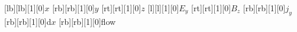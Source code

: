    [lb][lb][1][0]{$x$}
   [rb][rb][1][0]{$y$}
   [rt][rt][1][0]{$z$}
   [l][l][1][0]{$E_y$}
   [rt][rt][1][0]{$B_z$}
   [rb][rb][1][0]{$j_y$}
   [rb][rb][1][0]{d$x$}
   [rb][rb][1][0]{flow}

